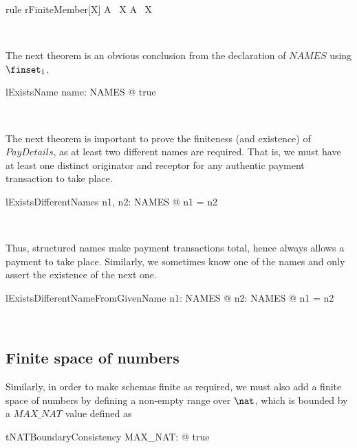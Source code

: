 \begin{LToolkit}
\begin{theorem}{rule rFiniteMember}[X]
    A \in \finset~X \implies A \in \power~X
\end{theorem}~\end{LToolkit}

The next theorem is an obvious conclusion from the declaration of $NAMES$ using $\finset_1$.
%
\begin{LNewLemma}
\begin{theorem}{lExistsName}
    \exists name: NAMES @ true
\end{theorem}~\end{LNewLemma}

The next theorem is important to prove the finiteness (and existence)
of $PayDetails$, as at least two different names are required. That is,
we must have at least one distinct originator and receptor for any
authentic payment transaction to take place.
%
\begin{LNewLemma}
\begin{theorem}{lExistsDifferentNames}
    \exists n1, n2: NAMES @ \lnot n1 = n2
\end{theorem}~\end{LNewLemma}
%
Thus, structured names make payment transactions total, hence
always allows a payment to take place. Similarly, we sometimes know
one of the names and only assert the existence of the next one.

\begin{LNewLemma}
\begin{theorem}{lExistsDifferentNameFromGivenName}
    \forall n1: NAMES @ \exists n2: NAMES @ \lnot n1 = n2
\end{theorem}~\end{LNewLemma}

\subsection{Finite space of numbers}\label{ch3.NAT}

Similarly, in order to make schemas finite as required,
we must also add a finite space of numbers by defining a
non-empty range over $\nat$, which is bounded by a $MAX\_NAT$
value defined as
%
\begin{LConsistency}
\begin{theorem}{tNATBoundaryConsistency}
   \exists MAX\_NAT: \nat @ true
\end{theorem}~\end{LConsistency}

